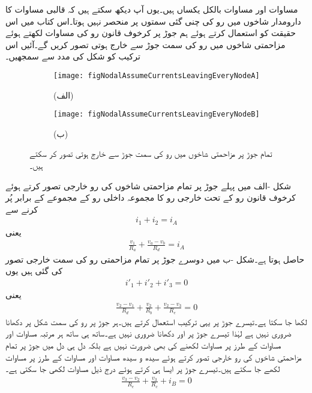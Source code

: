 مساوات  اور مساوات  بالکل یکساں ہیں۔یوں آپ دیکھ سکتے ہیں کہ قالبی مساوات کا دارومدار شاخوں میں رو کی چنی گئی سمتوں پر منحصر نہیں ہوتا۔اس کتاب میں اس حقیقت کو استعمال کرتے ہوئے ہم جوڑ پر کرخوف قانون رو کی مساوات لکھتے ہوئے مزاحمتی شاخوں میں رو کی سمت جوڑ سے خارج ہوتی تصور کریں گے۔آئیں اس ترکیب کو شکل  کی مدد سے سمجھیں۔
\begin{figure}
\centering
\begin{subfigure}{\textwidth}
\centering
\texttt{[image: figNodalAssumeCurrentsLeavingEveryNodeA]}
\caption*{(الف)}
\end{subfigure}
\begin{subfigure}{\textwidth}
\centering
\texttt{[image: figNodalAssumeCurrentsLeavingEveryNodeB]}
\caption*{(ب)}
\end{subfigure}
\caption{تمام جوڑ پر مزاحمتی شاخوں میں رو کی سمت جوڑ سے خارج ہوتی تصور کر سکتے ہیں۔}
\label{شکل_جوڑ_شاخوں_کی_رو_خارجی}
\end{figure}%

شکل -الف میں پہلے جوڑ پر تمام مزاحمتی شاخوں کی رو خارجی تصور کرتے ہوئے کرخوف قانون رو کے تحت خارجی رو کا مجموعہ داخلی رو کے مجموعے کے برابر پُر کرنے سے
\begin{align}\label{مساوات_جوڑ_رو_خارجی_الف}
i_1+i_2=i_A
\end{align}
یعنی
\begin{align}\label{مساوات_جوڑ_رو_خارجی_ب}
\frac{v_1}{R_a}+\frac{v_a-v_b}{R_d}=i_A
\end{align}
حاصل ہوتا ہے۔شکل -ب میں دوسرے جوڑ پر تمام مزاحمتی رو کی سمت خارجی تصور کی گئی ہیں یوں
\begin{align}\label{مساوات_جوڑ_رو_خارجی_پ}
i'_1+i'_2+i'_3=0
\end{align}
یعنی
\begin{align}\label{مساوات_جوڑ_رو_خارجی_ت}
\frac{v_2-v_1}{R_d}+\frac{v_2}{R_b}+\frac{v_2-v_3}{R_e}=0
\end{align}
لکھا جا سکتا ہے۔تیسرے جوڑ پر یہی ترکیب استعمال کرتے ہیں۔ہر جوڑ پر رو کی سمت شکل پر دکھانا ضروری نہیں ہے لہٰذا تیسرے جوڑ پر  اور  دکھانا ضروری نہیں ہے۔ساتھ ہی ساتھ ہر مرتبہ مساوات  اور مساوات  کے طرز پر مساوات لکھنے کی بھی ضرورت نہیں ہے بلکہ دل ہی دل میں جوڑ پر تمام مزاحمتی شاخوں کی رو خارجی تصور کرتے ہوئے سیدھ و سیدھ  مساوات  اور مساوات  کے طرز پر مساوات لکھے جا سکتے ہیں۔تیسرے جوڑ پر ایسا ہی کرتے ہوئے درج ذیل مساوات لکھی جا سکتی ہے۔
\begin{align}\label{مساوات_جوڑ_رو_خارجی_ٹ}
\frac{v_3-v_2}{R_e}+\frac{v_3}{R_c}+i_B=0
\end{align}

